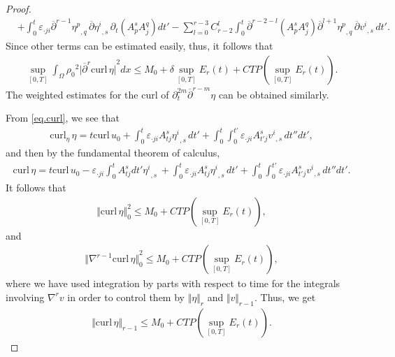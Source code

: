 \documentclass[12pt,twoside,reqno]{amsart}
\numberwithin{equation}{section}
\theoremstyle{definition}
\theoremstyle{remark}
\begin{document}
\begin{proof}
\begin{align*}
  &+\int_0^t {\varepsilon}_{\cdot ji}{\overline{\partial}}^{r-1}{{{\eta^p}}_{,{q}}\,}{\overline{\partial}} {{{\eta^i}}_{,{s}}\,}{\partial}_t(A^s_p A^q_j)dt'-\sum_{l=0}^{r-3}C_{r-2}^l\int_0^t{\overline{\partial}}^{r-2-l}(A^s_p A^q_j){\overline{\partial}}^{l+1}{{{\eta^p}}_{,{q}}\,}{\overline{\partial}} {{{v^i}}_{,{s}}\,}dt'.
\end{align*}
Since  other terms can be estimated easily, thus, it follows that
\begin{align*}
  \sup_{[0,T]}\int_\Omega {\rho_0}^2  {\vert{{\overline{\partial}}^r{\mathrm{curl}\,} \eta}\vert}^2dx
  {\leqslant} M_0+\delta\sup_{[0,T]}E_r(t)+CTP(\sup_{[0,T]}E_r(t)).
\end{align*}
The weighted estimates for the curl of ${\partial}_t^{2m}{\overline{\partial}}^{r-m} \eta$ can be obtained similarly.

From \eqref{eq.curl}, we see that
\begin{align*}
  {\mathrm{curl}_\eta\,} \eta=t{\mathrm{curl}\,} u_0+\int_0^t{\varepsilon}_{\cdot ji} A_{tj}^s{{{\eta^i}}_{,{s}}\,}dt'+\int_0^t\int_0^{t'} {\varepsilon}_{\cdot ji} A_{t'j}^s{{{v^i}}_{,{s}}\,}dt''dt',
\end{align*}
and then by the fundamental theorem of calculus,
\begin{align*}
  {\mathrm{curl}\,}\eta =t{\mathrm{curl}\,} u_0-{\varepsilon}_{\cdot ji}\int_0^t A_{tj}^sdt'{{{\eta^i}}_{,{s}}\,}+\int_0^t{\varepsilon}_{\cdot ji} A_{tj}^s{{{\eta^i}}_{,{s}}\,}dt'+\int_0^t\int_0^{t'} {\varepsilon}_{\cdot ji} A_{t'j}^s{{{v^i}}_{,{s}}\,}dt''dt'.
\end{align*}
It follows that
\begin{align*}
  {\Vert{{\mathrm{curl}\,}\eta}\Vert}_0^2{\leqslant} M_0+CTP(\sup_{[0,T]}E_r(t)),
\end{align*}
and
\begin{align*}
  {\Vert{{\nabla}^{r-1}{\mathrm{curl}\,}\eta}\Vert}_0^2{\leqslant} M_0+CTP(\sup_{[0,T]}E_r(t)),
\end{align*}
where we have used integration by parts with respect to time for the integrals involving ${\nabla}^rv$ in order to  control them by ${\Vert{\eta}\Vert}_r$ and ${\Vert{v}\Vert}_{r-1}$. Thus, we get
\begin{align}
  {\Vert{{\mathrm{curl}\,}\eta}\Vert}_{r-1}{\leqslant} M_0+CTP(\sup_{[0,T]}E_r(t)).
\end{align}


\end{proof}
\end{document}
